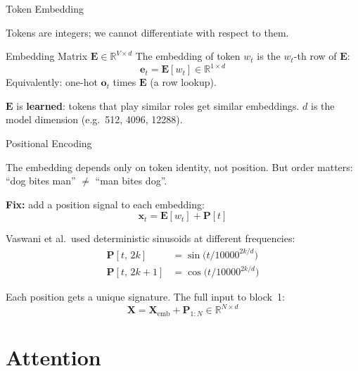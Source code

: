 \documentclass[aspectratio=169, professionalfonts]{beamer}
\def\R{\mathbb{R}}
\begin{document}
\begin{frame}{Token Embedding}

Tokens are integers; we cannot differentiate with respect to them.

\bigskip

\begin{block}{Embedding Matrix $\mathbf{E} \in \R^{V \times d}$}
The embedding of token $w_t$ is the $w_t$-th row of $\mathbf{E}$:
$$\mathbf{e}_t = \mathbf{E}[w_t] \in \R^{1 \times d}$$
Equivalently: one-hot $\mathbf{o}_t$ times $\mathbf{E}$ (a row lookup).
\end{block}

\bigskip

$\mathbf{E}$ is \textbf{learned}: tokens that play similar roles get
similar embeddings. $d$ is the model dimension (e.g.\ 512, 4096, 12288).

\end{frame}

\begin{frame}{Positional Encoding}

The embedding depends only on token identity, not position.
But order matters: ``dog bites man'' $\ne$ ``man bites dog''.

\bigskip

\textbf{Fix:} add a position signal to each embedding:
$$\mathbf{x}_t = \mathbf{E}[w_t] + \mathbf{P}[t]$$

Vaswani et al.\ used deterministic sinusoids at different frequencies:
\begin{align*}
\mathbf{P}[t,\,2k]   &= \sin\!\bigl(t / 10000^{2k/d}\bigr) \\
\mathbf{P}[t,\,2k{+}1] &= \cos\!\bigl(t / 10000^{2k/d}\bigr)
\end{align*}

Each position gets a unique signature. The full input to block~1:
$$\mathbf{X} = \mathbf{X}_\text{emb} + \mathbf{P}_{1:N}
  \in \R^{N \times d}$$

\end{frame}

\section{Attention}
\end{document}

